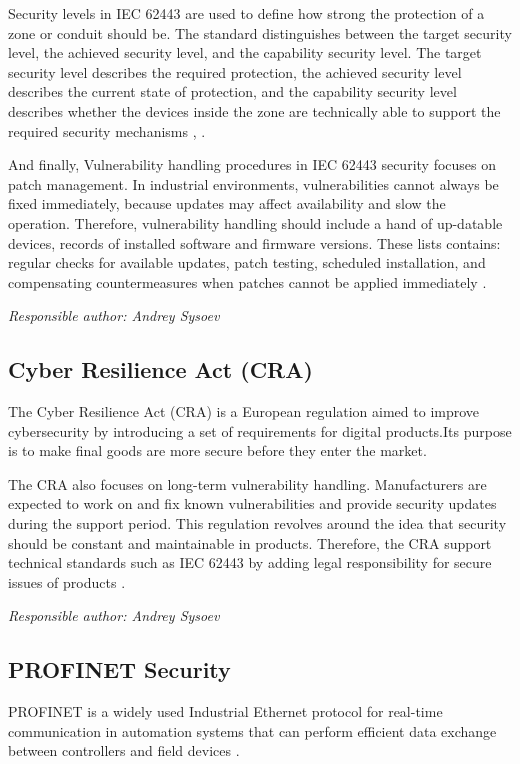 \documentclass[conference]{IEEEtran}
\begin{document}
Security levels in IEC 62443 are used to define how strong the protection of a zone or conduit should be. The standard distinguishes between the target security level, the achieved security level, and the capability security level. The target security level describes the required protection, the achieved security level describes the current state of protection, and the capability security level describes whether the devices inside the zone are technically able to support the required security mechanisms \cite{b12}, \cite{b13}.

And finally, Vulnerability handling procedures in IEC 62443 security  focuses on patch management. In industrial environments, vulnerabilities cannot always be fixed immediately, because updates may affect availability and slow the operation. Therefore, vulnerability handling should include a hand of up-datable devices, records of installed software and firmware versions. These lists contains: regular checks for available updates, patch testing, scheduled installation, and compensating countermeasures when patches cannot be applied immediately \cite{b14}.

\textit{Responsible author: Andrey Sysoev}
\subsection  {Cyber Resilience Act (CRA)}
The Cyber Resilience Act (CRA) is a European regulation aimed to improve cybersecurity by introducing a set of requirements for digital products.Its purpose is to make final goods are more secure before they enter the market\cite{b15}.

The CRA also focuses on long-term vulnerability handling. Manufacturers are expected to work on and fix known vulnerabilities and provide security updates during the support period. This regulation revolves around the idea that security should be constant and maintainable in products. Therefore, the CRA support technical standards such as IEC 62443 by adding legal responsibility for secure issues of  products \cite{b15}.

\textit{Responsible author: Andrey Sysoev}
\subsection {PROFINET Security}
PROFINET is a widely used Industrial Ethernet protocol for real-time communication in automation systems that can perform efficient data exchange between controllers and field devices \cite{b16}. 
\end{document}
